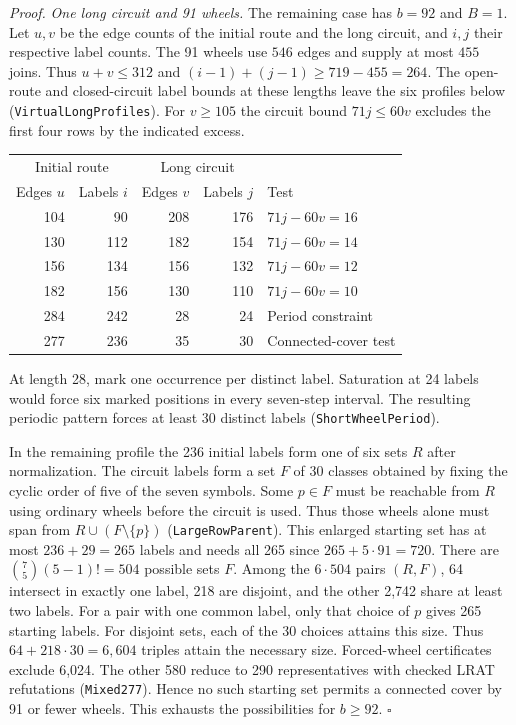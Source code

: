 \documentclass[11pt]{article}
\newenvironment{proof}[1][Proof]{\par\smallskip\noindent\textit{#1.}\enspace}{\unskip\nobreak\hfill\ensuremath{\square}\par\smallskip}
\begin{document}
\begin{proof}
\smallskip\noindent\emph{One long circuit and 91 wheels.} The remaining case has $b=92$ and $B=1$. Let $u,v$ be the edge counts of the initial route and the long circuit, and $i,j$ their respective label counts.
The 91 wheels use $546$ edges and supply at most $455$ joins. Thus $u+v\le312$ and $(i-1)+(j-1)\ge719-455=264$. The open-route and closed-circuit label bounds at these lengths leave the six profiles below (\texttt{VirtualLongProfiles}). For $v\ge105$ the circuit bound $71j\le60v$ excludes the first four rows by the indicated excess.
\begin{center}
\begin{tabular}{@{}rr@{\qquad}rr@{\qquad}l@{}}\toprule
\multicolumn{2}{c}{Initial route} & \multicolumn{2}{c}{Long circuit} & \\
Edges $u$ & Labels $i$ & Edges $v$ & Labels $j$ & Test \\ \midrule
104 & 90  & 208 & 176 & $71j-60v=16$ \\
130 & 112 & 182 & 154 & $71j-60v=14$ \\
156 & 134 & 156 & 132 & $71j-60v=12$ \\
182 & 156 & 130 & 110 & $71j-60v=10$ \\
284 & 242 &  28 &  24 & Period constraint \\
277 & 236 &  35 &  30 & Connected-cover test \\ \bottomrule
\end{tabular}
\end{center}
At length 28, mark one occurrence per distinct label. Saturation at 24 labels would force six marked positions
in every seven-step interval. The resulting periodic pattern forces at
least 30 distinct labels (\texttt{ShortWheelPeriod}).

In the remaining profile the 236 initial labels form one of six sets $R$
after normalization. The circuit labels form a set $F$ of 30 classes
obtained by fixing the cyclic order of five of the seven symbols. Some $p\in F$ must be
reachable from $R$ using ordinary wheels before the circuit is used.
Thus those wheels alone must span from $R\cup(F\setminus\{p\})$
(\texttt{LargeRowParent}). This enlarged starting set has at most $236+29=265$ labels and needs all 265 since $265+5\cdot91=720$. There are $\binom{7}{5}(5-1)!=504$ possible sets $F$. Among the $6\cdot504$ pairs $(R,F)$, 64 intersect in exactly one label, 218 are disjoint, and the other 2,742 share at least two labels. For a pair with one common label, only that choice of $p$ gives 265 starting labels. For disjoint sets, each of the 30 choices attains this size. Thus $64+218\cdot30=6{,}604$ triples attain the necessary size. Forced-wheel certificates exclude 6,024. The other 580 reduce to 290
representatives with checked LRAT refutations (\texttt{Mixed277}).
Hence no such starting set permits a connected cover by 91 or fewer wheels. This exhausts
the possibilities for $b\ge92$.
\end{proof}
\end{document}
